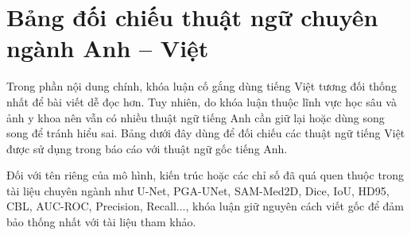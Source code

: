 \chapter*{Bảng đối chiếu thuật ngữ chuyên ngành Anh -- Việt}
\label{doichieuthuatngu}

Trong phần nội dung chính, khóa luận cố gắng dùng tiếng Việt tương đối thống nhất để bài viết dễ đọc hơn. Tuy nhiên, do khóa luận thuộc lĩnh vực học sâu và ảnh y khoa nên vẫn có nhiều thuật ngữ tiếng Anh cần giữ lại hoặc dùng song song để tránh hiểu sai. Bảng dưới đây dùng để đối chiếu các thuật ngữ tiếng Việt được sử dụng trong báo cáo với thuật ngữ gốc tiếng Anh.

Đối với tên riêng của mô hình, kiến trúc hoặc các chỉ số đã quá quen thuộc trong tài liệu chuyên ngành như U-Net, PGA-UNet, SAM-Med2D, Dice, IoU, HD95, CBL, AUC-ROC, Precision, Recall..., khóa luận giữ nguyên cách viết gốc để đảm bảo thống nhất với tài liệu tham khảo.


